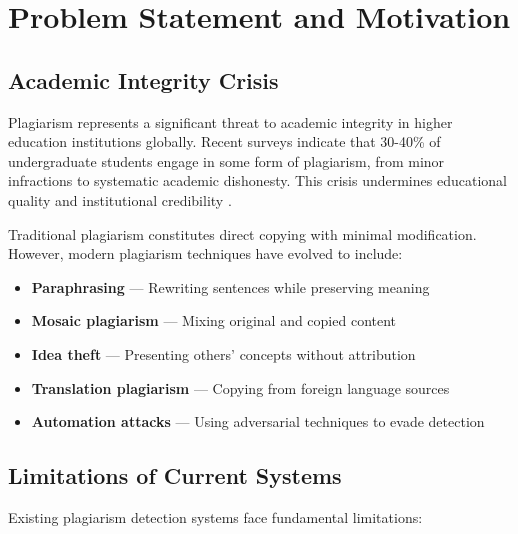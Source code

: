 \section{Problem Statement and Motivation} \label{sec:problem}

\subsection{Academic Integrity Crisis}

Plagiarism represents a significant threat to academic integrity in higher education institutions globally. Recent surveys indicate that 30-40\% of undergraduate students engage in some form of plagiarism, from minor infractions to systematic academic dishonesty. This crisis undermines educational quality and institutional credibility \cite{Callan2018}.

Traditional plagiarism constitutes direct copying with minimal modification. However, modern plagiarism techniques have evolved to include:
\begin{itemize}
  \item \textbf{Paraphrasing} --- Rewriting sentences while preserving meaning
  \item \textbf{Mosaic plagiarism} --- Mixing original and copied content
  \item \textbf{Idea theft} --- Presenting others' concepts without attribution
  \item \textbf{Translation plagiarism} --- Copying from foreign language sources
  \item \textbf{Automation attacks} --- Using adversarial techniques to evade detection
\end{itemize}

\subsection{Limitations of Current Systems}

Existing plagiarism detection systems face fundamental limitations:

